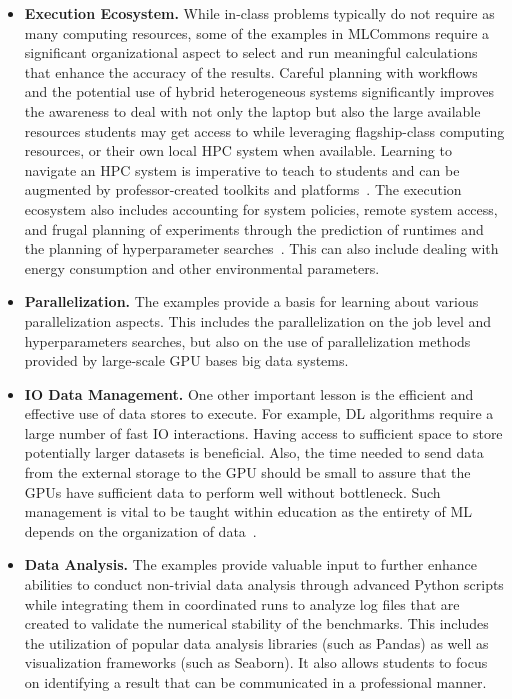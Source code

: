 \documentclass[utf8]{FrontiersinVancouver} %
\begin{document}
\begin{itemize}
\item {\bf Execution Ecosystem.} While in-class problems typically do not require as many computing resources, some of the examples in MLCommons require a significant organizational aspect to select and run meaningful calculations that enhance the accuracy of the results. Careful planning with workflows and the potential use of hybrid heterogeneous systems significantly improves the awareness to deal with not only the laptop but also the large available resources students may get access to while leveraging flagship-class computing resources, or their own local HPC system when available. Learning to navigate an HPC system is imperative to teach to students and can be augmented by professor-created toolkits and platforms~\cite{zou}. The execution ecosystem also includes accounting for system policies, remote system access, and frugal planning of experiments through the prediction of runtimes and the planning of hyperparameter searches~\cite{claesen}. This can also include dealing with energy consumption and other environmental parameters.

\item {\bf Parallelization.} The examples provide a basis for learning about various parallelization aspects. This includes the parallelization on the job level and hyperparameters searches, but also on the use of parallelization methods provided by large-scale GPU bases big data systems.

\item {\bf IO Data Management.} One other important lesson is the efficient and effective use of data stores to execute. For example, DL algorithms require a large number of fast IO interactions. Having access to sufficient space to store potentially larger datasets is beneficial. Also, the time needed to send data from the external storage to the GPU should be small to assure that the GPUs have sufficient data to perform well without bottleneck. Such management is vital to be taught within education as the entirety of ML depends on the organization of data~\cite{shapiro}.

\item {\bf Data Analysis.} The examples provide valuable input to further enhance abilities to conduct non-trivial data analysis through advanced Python scripts while integrating them in coordinated runs to analyze log files that are created to validate the numerical stability of the benchmarks. This includes the utilization of popular data analysis libraries (such as Pandas) as well as visualization frameworks (such as Seaborn). It also allows students to focus on identifying a result that can be communicated in a professional manner.


\end{itemize}
\end{document}
